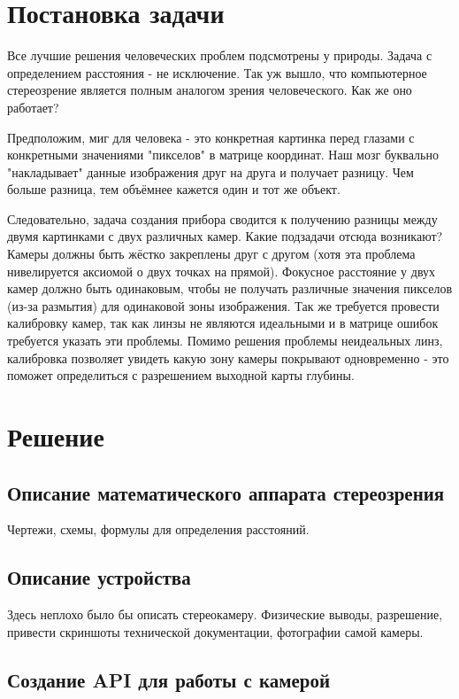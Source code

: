 \section{Постановка задачи}

Все лучшие решения человеческих проблем подсмотрены у природы. Задача с определением расстояния - не исключение. Так уж вышло, что компьютерное стереозрение является полным аналогом зрения человеческого. Как же оно работает?

Предположим, миг для человека - это конкретная картинка перед глазами с конкретными значениями "пикселов" в матрице координат. Наш мозг буквально "накладывает" данные изображения друг на друга и получает разницу. Чем больше разница, тем объёмнее кажется один и тот же объект.

Следовательно, задача создания прибора сводится к получению разницы между двумя картинками с двух различных камер. Какие подзадачи отсюда возникают? Камеры должны быть жёстко закреплены друг с другом (хотя эта проблема нивелируется аксиомой о двух точках на прямой). Фокусное расстояние у двух камер должно быть одинаковым, чтобы не получать различные значения пикселов (из-за размытия) для одинаковой зоны изображения. Так же требуется провести калибровку камер, так как линзы не являются идеальными и в матрице ошибок требуется указать эти проблемы. Помимо решения проблемы неидеальных линз, калибровка позволяет увидеть какую зону камеры покрывают одновременно - это поможет определиться с разрешением выходной карты глубины.

\section{Решение}

\subsection{Описание математического аппарата стереозрения}

Чертежи, схемы, формулы для определения расстояний.

\subsection{Описание устройства}

Здесь неплохо было бы описать стереокамеру. Физические выводы, разрешение, привести скриншоты технической документации, фотографии самой камеры.

\subsection{Создание API для работы с камерой}

